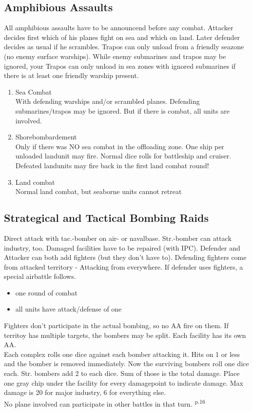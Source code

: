 \documentclass[10pt,a4paper,landscape]{article}
\begin{document}
\begin{multicols*}{3}
\subsection*{Amphibious Assaults}
All amphibious assaults have to be announcend before any combat. Attacker decides first which of his planes fight on sea and which on land. Later defender decides as usual if he scrambles. Trapos can only unload from a friendly seazone (no enemy surface warships). While enemy submarines and trapos may be ignored, your Trapos can only unload in sea zones with ignored submarines if there is at least one friendly warship present.
\begin{enumerate}
\item Sea Combat\\
With defending warships and/or scrambled planes. Defending submarines/trapos may be ignored. But if there is combat, all units are involved.
\item Shorebombardement\\
Only if there was NO sea combat in the offloading zone.  One ship per unloaded landunit may fire. Normal dice rolls for battleship and cruiser. Defeated landunits may fire back in the first land combat round!
\item Land combat\\
Normal land combat, but seaborne units cannot retreat
\end{enumerate}

\subsection*{Strategical and Tactical Bombing Raids}
Direct attack with tac.-bomber on air- or navalbase. Str.-bomber can attack industry, too.
Damaged facilities have to be repaired (with IPC). Defender and Attacker can both add fighters (but they don't have to). Defending fighters come from attacked territory - Attacking from everywhere. If defender uses fighters, a special airbattle follows. 
\begin{itemize}
\item one round of combat
\item all units have attack/defense of one
\end{itemize}
Fighters don't participate in the actual bombing, so no AA fire on them. If territoy has multiple targets, the bombers may be split. Each facility has its own AA.\\
Each complex rolls one dice against each bomber attacking it. Hits on 1 or less and the bomber is removed immediately. Now the surviving bombers roll one dice each. Str. bombers add 2 to each dice. Sum of those is the total damage. Place one gray chip under the facility for every damagepoint to indicate damage. Max damage is 20 for major industry, 6 for everything else.\\
No plane involved can participate in other battles in that turn. \textsuperscript{p.16}


\end{multicols*}
\end{document}
